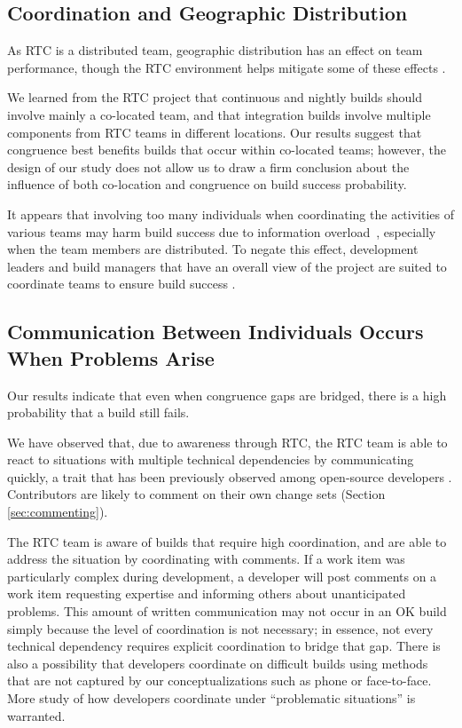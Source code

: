 \subsection{Coordination and Geographic Distribution}
As RTC is a distributed team, geographic distribution has an effect on team performance, though the RTC environment helps mitigate some of these effects \cite{Nguyen:2008Distance}.

We learned from the RTC project that continuous and nightly builds should involve mainly a co-located team, and that integration builds involve multiple components from RTC teams in different locations. Our results suggest that congruence best benefits builds that occur within co-located teams; however, the design of our study does not allow us to draw a firm conclusion about the influence of both co-location and congruence on build success probability.

It appears that involving too many individuals when coordinating the activities of various teams may harm build success due to information overload~\cite{damian:icgse:2007}, especially when the team members are distributed. To negate this effect, development leaders and build managers that have an overall view of the project are suited to coordinate teams to ensure build success \cite{hinds:cscw:2006}.

\subsection{Communication Between Individuals Occurs When Problems Arise}
\label{sec:communicating_problems}
Our results indicate that even when congruence gaps are bridged, there is a high probability that a build still fails.

We have observed that, due to awareness through RTC, the RTC team is able to react to situations with multiple technical dependencies by communicating quickly, a trait that has been previously observed among open-source developers \cite{mockus2002:opensource}. Contributors are likely to comment on their own change sets (Section \ref{sec:commenting}).

The RTC team is aware of builds that require high coordination, and are able to address the situation by coordinating with comments. If a work item was particularly complex during development, a developer will post comments on a work item requesting expertise and informing others about unanticipated problems.
This amount of written communication may not occur in an OK build simply because the level of coordination is not necessary; in essence, not every technical dependency requires explicit coordination to bridge that gap.
There is also a possibility that developers coordinate on difficult builds using methods that are not captured by our conceptualizations such as phone or face-to-face. More study of how developers coordinate under ``problematic situations'' is warranted.


